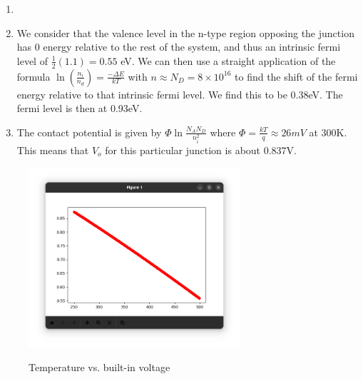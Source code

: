\documentclass{article}
\begin{document}
\begin{prob}
	\begin{enumerate}
	\item
\item We consider that the valence level in the n-type region opposing the junction has 0 energy relative to the rest of the system, and thus an intrinsic fermi level of $\frac{1}{2}(1.1)= 0.55$ eV.
	We can then use a straight application of the formula $\ln(\frac{n_i}{n_d})=\frac{-\Delta E}{kT}$ with $n\approx N_D=8\times10^{16}$ to find the shift of the fermi energy relative to that intrinsic fermi level. We find this to be 0.38eV.
	The fermi level is then at 0.93eV. 

\item The contact potential is given by $\Phi \ln{\frac{N_AN_D}{n_i^2}}$ where $\Phi =\frac{kT}{q} \approx 26mV$ at 300K. This means that $V_o$ for this particular junction is about 0.837V.
	
\end{enumerate}
\end{prob}
\begin{figure}[h]
	\includegraphics[width =0.7\textwidth]{graph2.png}
	\label{grappph}
	\caption{Temperature vs. built-in voltage}
\end{figure}
\end{document}
